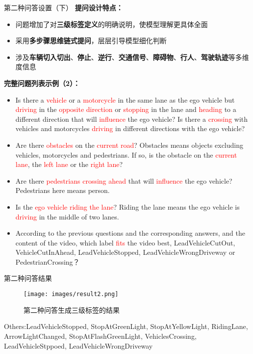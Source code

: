 \documentclass[serif]{beamer}
\begin{document}
\begin{frame}{第二种问答设置（下）}
\scriptsize
\textbf{提问设计特点：}
\begin{itemize}
  \item 问题增加了对\textbf{三级标签定义}的明确说明，使模型理解更具体全面
  \item 采用\textbf{多步骤思维链式提问}，层层引导模型细化判断
  \item 涉及\textbf{车辆切入切出}、\textbf{停止}、\textbf{逆行}、\textbf{交通信号}、\textbf{障碍物}、\textbf{行人}、\textbf{驾驶轨迹}等多维度信息
\end{itemize}

\vspace{0.6em}
\textbf{完整问题列表示例（2）：}

\begin{itemize}
  \item Is there a \textcolor{red}{vehicle} or a \textcolor{red}{motorcycle} in the same lane as the ego vehicle but \textcolor{red}{driving} in the \textcolor{red}{opposite direction} or \textcolor{red}{stopping} in the lane and \textcolor{red}{heading} to a different direction that will \textcolor{red}{influence} the ego vehicle? Is there a \textcolor{red}{crossing} with vehicles and motorcycles \textcolor{red}{driving} in different directions with the ego vehicle?
  \item Are there \textcolor{red}{obstacles} on the \textcolor{red}{current road}? Obstacles means objects excluding vehicles, motorcycles and pedestrians. If so, is the obstacle on the \textcolor{red}{current lane}, the \textcolor{red}{left lane} or the \textcolor{red}{right lane}?
  \item Are there \textcolor{red}{pedestrians} \textcolor{red}{crossing} \textcolor{red}{ahead} that will \textcolor{red}{influence} the ego vehicle? Pedestrians here means person.
  \item Is the \textcolor{red}{ego vehicle riding the lane}? Riding the lane means the ego vehicle is \textcolor{red}{driving} in the middle of two lanes.
  \item According to the previous questions and the corresponding answers, and the content of the video, which label \textcolor{red}{fits} the video best, LeadVehicleCutOut, VehicleCutInAhead, LeadVehicleStopped, LeadVehicleWrongDriveway or PedestrianCrossing？
\end{itemize}
\normalsize
\end{frame}


\begin{frame}{第二种问答结果}

\begin{figure}
    \centering
    \texttt{[image: images/result2.png]}
    \caption{第二种问答生成三级标签的结果}
\end{figure}

\scriptsize
Others:LeadVehicleStopped, StopAtGreenLight, StopAtYellowLight, RidingLane, ArrowLightChanged, StopAtFlashGreenLight, VehiclesCrossing, LeadVehicleStppoed, LeadVehicleWrongDriveway
\normalsize

\end{frame}
\end{document}
